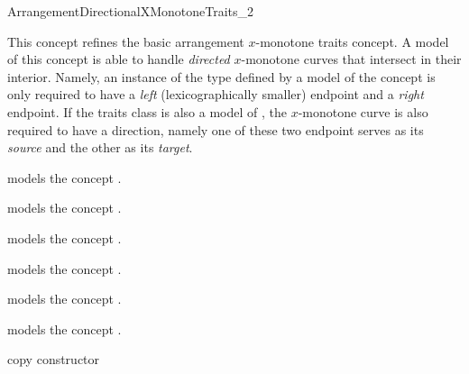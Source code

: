 
\ccRefPageBegin

\begin{ccRefConcept}{ArrangementDirectionalXMonotoneTraits_2}

\ccDefinition
This concept refines the basic arrangement $x$-monotone traits concept.
A model of this concept is able to handle \emph{directed} $x$-monotone curves
that intersect in their interior. Namely, an instance of the
 type defined by a model of the concept
 is only required to have a \emph{left}
(lexicographically smaller) endpoint and a \emph{right} endpoint.
If the traits class is also a model of
, the $x$-monotone curve is
also required to have a direction, namely one of these two endpoint serves
as its \emph{source} and the other as its \emph{target}.

\ccRefines
{}


\ccThreeToTwo

{models the concept .}

{models the concept .}

{models the concept .}

{models the concept .}

{models the concept .}

{models the concept .}

\ccCreation
{}

\ccThreeToTwo

\ccGlue
{}
{copy constructor}
\ccGlue
{}



\end{ccRefConcept}
